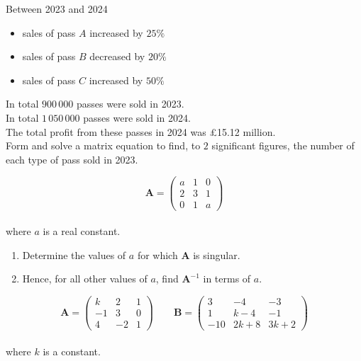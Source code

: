 \documentclass[leqno]{article}
\begin{document}
\begin{enumerate}[
  label=\textbf{\arabic*.},
  leftmargin=*,
  topsep=0pt,
  partopsep=0pt,
  parsep=0pt
]
Between 2023 and 2024
\begin{itemize}
\item sales of pass $A$ increased by $25\%$
\item sales of pass $B$ decreased by $20\%$
\item sales of pass $C$ increased by $50\%$
\end{itemize}

In total $900\,000$ passes were sold in 2023. \\

In total $1\,050\,000$ passes were sold in 2024. \\

The total profit from these passes in 2024 was \pounds 15.12 million. \\

Form and solve a matrix equation to find, to $2$ significant figures, the number of each type of pass sold in 2023.  \\

\newpage

\questionitem

\[
\mathbf{A} = \begin{pmatrix}
a & 1 & 0 \\
2 & 3 & 1 \\
0 & 1 & a
\end{pmatrix}
\] \\
where $a$ is a real constant. \\

\begin{enumerate}[label=\textbf{(\alph*)}]
  \item Determine the values of $a$ for which $\mathbf{A}$ is singular.  \\
  \item Hence, for all other values of $a$, find $\mathbf{A}^{-1}$ in terms of $a$.  \\
\end{enumerate}

\newpage


\newpage

\questionitem

\[
\mathbf{A} = \begin{pmatrix}
k & 2 & 1 \\
-1 & 3 & 0 \\
4 & -2 & 1
\end{pmatrix}
\qquad
\mathbf{B} = \begin{pmatrix}
3 & -4 & -3 \\
1 & k - 4 & -1 \\
-10 & 2k + 8 & 3k + 2
\end{pmatrix}
\] \\
where $k$ is a constant. \\


\end{enumerate}
\end{document}
